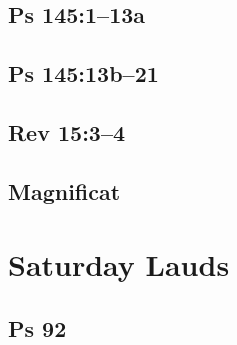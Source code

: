 \subsection{Ps 145:1--13a}

{%
\parindent 0pt
\noindent
\ifx\preLilyPondExample \undefined
\else
  \expandafter\preLilyPondExample
\fi
\def\lilypondbook{}%

\ifx\postLilyPondExample \undefined
\else
  \expandafter\postLilyPondExample
\fi
}

\subsection{Ps 145:13b--21}

{%
\parindent 0pt
\noindent
\ifx\preLilyPondExample \undefined
\else
  \expandafter\preLilyPondExample
\fi
\def\lilypondbook{}%

\ifx\postLilyPondExample \undefined
\else
  \expandafter\postLilyPondExample
\fi
}

\subsection{Rev 15:3--4}

{%
\parindent 0pt
\noindent
\ifx\preLilyPondExample \undefined
\else
  \expandafter\preLilyPondExample
\fi
\def\lilypondbook{}%

\ifx\postLilyPondExample \undefined
\else
  \expandafter\postLilyPondExample
\fi
}

\subsection{Magnificat}

{%
\parindent 0pt
\noindent
\ifx\preLilyPondExample \undefined
\else
  \expandafter\preLilyPondExample
\fi
\def\lilypondbook{}%

\ifx\postLilyPondExample \undefined
\else
  \expandafter\postLilyPondExample
\fi
}


\section{Saturday Lauds}

\subsection{Ps 92}

{%
\parindent 0pt
\noindent
\ifx\preLilyPondExample \undefined
\else
  \expandafter\preLilyPondExample
\fi
\def\lilypondbook{}%

\ifx\postLilyPondExample \undefined
\else
  \expandafter\postLilyPondExample
\fi
}

